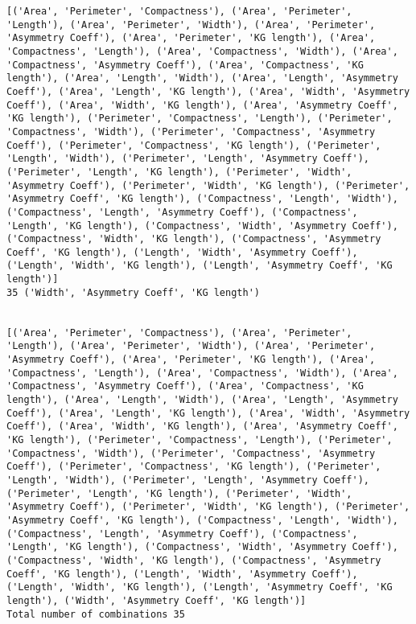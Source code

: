 \documentclass[11pt]{article}
\begin{document}
\begin{Verbatim}[commandchars=\\\{\}]
[('Area', 'Perimeter', 'Compactness'), ('Area', 'Perimeter', 'Length'), ('Area', 'Perimeter', 'Width'), ('Area', 'Perimeter', 'Asymmetry Coeff'), ('Area', 'Perimeter', 'KG length'), ('Area', 'Compactness', 'Length'), ('Area', 'Compactness', 'Width'), ('Area', 'Compactness', 'Asymmetry Coeff'), ('Area', 'Compactness', 'KG length'), ('Area', 'Length', 'Width'), ('Area', 'Length', 'Asymmetry Coeff'), ('Area', 'Length', 'KG length'), ('Area', 'Width', 'Asymmetry Coeff'), ('Area', 'Width', 'KG length'), ('Area', 'Asymmetry Coeff', 'KG length'), ('Perimeter', 'Compactness', 'Length'), ('Perimeter', 'Compactness', 'Width'), ('Perimeter', 'Compactness', 'Asymmetry Coeff'), ('Perimeter', 'Compactness', 'KG length'), ('Perimeter', 'Length', 'Width'), ('Perimeter', 'Length', 'Asymmetry Coeff'), ('Perimeter', 'Length', 'KG length'), ('Perimeter', 'Width', 'Asymmetry Coeff'), ('Perimeter', 'Width', 'KG length'), ('Perimeter', 'Asymmetry Coeff', 'KG length'), ('Compactness', 'Length', 'Width'), ('Compactness', 'Length', 'Asymmetry Coeff'), ('Compactness', 'Length', 'KG length'), ('Compactness', 'Width', 'Asymmetry Coeff'), ('Compactness', 'Width', 'KG length'), ('Compactness', 'Asymmetry Coeff', 'KG length'), ('Length', 'Width', 'Asymmetry Coeff'), ('Length', 'Width', 'KG length'), ('Length', 'Asymmetry Coeff', 'KG length')]
35 ('Width', 'Asymmetry Coeff', 'KG length')


[('Area', 'Perimeter', 'Compactness'), ('Area', 'Perimeter', 'Length'), ('Area', 'Perimeter', 'Width'), ('Area', 'Perimeter', 'Asymmetry Coeff'), ('Area', 'Perimeter', 'KG length'), ('Area', 'Compactness', 'Length'), ('Area', 'Compactness', 'Width'), ('Area', 'Compactness', 'Asymmetry Coeff'), ('Area', 'Compactness', 'KG length'), ('Area', 'Length', 'Width'), ('Area', 'Length', 'Asymmetry Coeff'), ('Area', 'Length', 'KG length'), ('Area', 'Width', 'Asymmetry Coeff'), ('Area', 'Width', 'KG length'), ('Area', 'Asymmetry Coeff', 'KG length'), ('Perimeter', 'Compactness', 'Length'), ('Perimeter', 'Compactness', 'Width'), ('Perimeter', 'Compactness', 'Asymmetry Coeff'), ('Perimeter', 'Compactness', 'KG length'), ('Perimeter', 'Length', 'Width'), ('Perimeter', 'Length', 'Asymmetry Coeff'), ('Perimeter', 'Length', 'KG length'), ('Perimeter', 'Width', 'Asymmetry Coeff'), ('Perimeter', 'Width', 'KG length'), ('Perimeter', 'Asymmetry Coeff', 'KG length'), ('Compactness', 'Length', 'Width'), ('Compactness', 'Length', 'Asymmetry Coeff'), ('Compactness', 'Length', 'KG length'), ('Compactness', 'Width', 'Asymmetry Coeff'), ('Compactness', 'Width', 'KG length'), ('Compactness', 'Asymmetry Coeff', 'KG length'), ('Length', 'Width', 'Asymmetry Coeff'), ('Length', 'Width', 'KG length'), ('Length', 'Asymmetry Coeff', 'KG length'), ('Width', 'Asymmetry Coeff', 'KG length')]
Total number of combinations 35

    \end{Verbatim}
\end{document}
